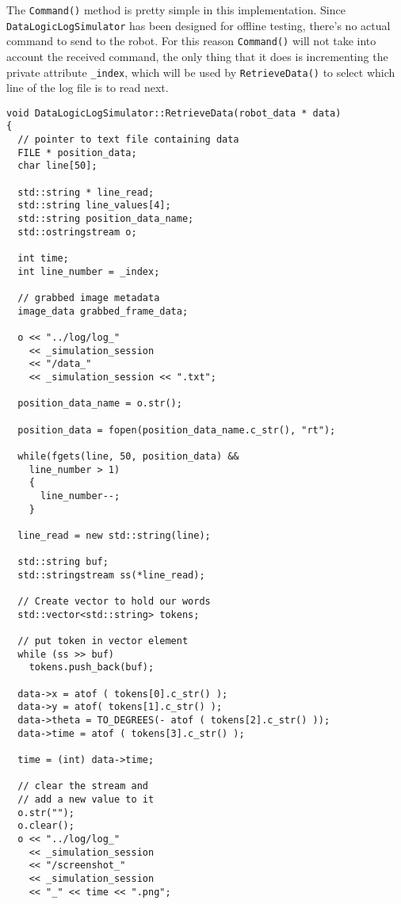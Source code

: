 The \texttt{Command()} method is pretty simple in this 
implementation. Since \texttt{DataLogicLogSimulator} has been designed 
for offline testing, there's no actual command to send to the robot.
For this reason \texttt{Command()} will not take into account
the received command, the only thing that it does is 
incrementing the private attribute \texttt{\_index}, which 
will be used by \texttt{RetrieveData()} to select which line 
of the log file is to read next.
\\
\begin{lstlisting}[caption={\texttt{DataLogicLogSimulator::RetrieveData()} method},
    label={code:datalogiclogsimulator:retrievedata}]
void DataLogicLogSimulator::RetrieveData(robot_data * data)
{
  // pointer to text file containing data
  FILE * position_data;
  char line[50];
  
  std::string * line_read;
  std::string line_values[4];
  std::string position_data_name;
  std::ostringstream o;
  
  int time;
  int line_number = _index;

  // grabbed image metadata
  image_data grabbed_frame_data;
  
  o << "../log/log_" 
    << _simulation_session 
    << "/data_" 
    << _simulation_session << ".txt";

  position_data_name = o.str();

  position_data = fopen(position_data_name.c_str(), "rt");

  while(fgets(line, 50, position_data) &&
	line_number > 1)
    {
      line_number--;
    }

  line_read = new std::string(line);

  std::string buf;
  std::stringstream ss(*line_read);

  // Create vector to hold our words
  std::vector<std::string> tokens;
  
  // put token in vector element
  while (ss >> buf)
    tokens.push_back(buf);

  data->x = atof ( tokens[0].c_str() );
  data->y = atof( tokens[1].c_str() );
  data->theta = TO_DEGREES(- atof ( tokens[2].c_str() ));
  data->time = atof ( tokens[3].c_str() );

  time = (int) data->time;

  // clear the stream and 
  // add a new value to it
  o.str("");
  o.clear();
  o << "../log/log_" 
    << _simulation_session 
    << "/screenshot_" 
    << _simulation_session 
    << "_" << time << ".png";


\end{lstlisting}
